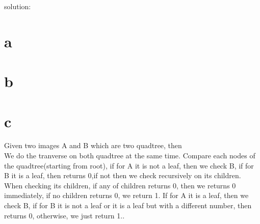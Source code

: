 \documentclass[12pt]{article}
\begin{document}
	
	solution:
	\begin{enumerate}
		\part{a} 
		
		\part{b} 
		
		\part{c} Given two images A and B which are two quadtree, then\\
		We do the tranverse on both quadtree at the same time. Compare each nodes of the quadtree(starting from root), if for A it is not a leaf, then we check B, if for B it is a leaf, then returns 0,if not then we check recursively on its children. When checking its children, if any of children returns 0, then we returns 0 immediately, if no children returns 0, we return 1. If for A it is a leaf, then we check B, if for B it is not a leaf or it is a leaf but with a different number, then returns 0, otherwise, we just return 1..
		
		
	\end{enumerate}
	
\end{document}
